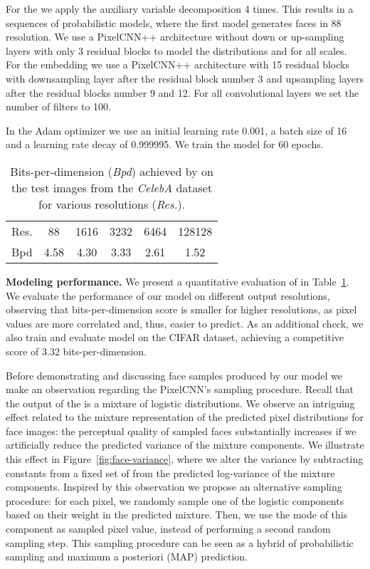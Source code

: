 For the \PYRAMID we apply the auxiliary variable decomposition 4 times.
This results in a sequences of probabilistic models, where the first model generates 
faces in 88 resolution. We use a PixelCNN++ architecture without down or up-sampling layers with 
only 3 residual blocks to model the distributions  and 
for all scales.
For the embedding  we use a PixelCNN++ architecture with
15 residual blocks with downsampling layer after the residual block 
number 3 and upsampling layers after the residual blocks number 9 and 12.
For all convolutional layers we set the number of filters to 100.

In the Adam optimizer we use an initial learning rate 0.001, a batch 
size of 16 and a learning rate decay of 0.999995.
We train the model for 60 epochs.

\begin{table}[t]
	\center
        \begin{tabular}{|l||c|c|c|c|c|}
        \hline
		Res. & 88 & 1616 & 3232  & 6464 & 128128 \\
		Bpd  & 4.58 & 4.30 & 3.33 & 2.61 & 1.52 \\
	\hline
	\end{tabular}
	\caption{Bits-per-dimension (\emph{Bpd}) achieved by \PYRAMID on the test images
	         from the \emph{CelebA} dataset for various resolutions (\emph{Res.}).}
	\label{table:CelebA}
\end{table}

\textbf{Modeling performance.}
We present a quantitative evaluation of \PYRAMID in Table~\ref{table:CelebA}.
We evaluate the performance of our model on different output resolutions,
observing that bits-per-dimension score is smaller for higher resolutions,
as pixel values are more correlated and, thus, easier to predict.
As an additional check, we also train and evaluate \PYRAMID model on
the CIFAR dataset, achieving a competitive score of 3.32 bits-per-dimension.

Before demonstrating and discussing face samples produced by our model 
we make an observation regarding the PixelCNN's sampling procedure.
Recall that the output of the \PYRAMID is a mixture of logistic 
distributions.
We observe an intriguing effect related to the mixture representation 
of the predicted pixel distributions for face images:
the perceptual quality of sampled faces substantially increases if 
we artificially reduce the predicted variance of the mixture components.
We illustrate this effect in Figure~\ref{fig:face-variance}, where 
we alter the variance by subtracting constants from a fixed set 
of  from the predicted log-variance of 
the mixture components.
Inspired by this observation we propose an alternative sampling procedure: 
for each pixel, we randomly sample one of the logistic components based 
on their weight in the predicted mixture. Then, we use the mode of this 
component as sampled pixel value, instead of performing a second random 
sampling step.
This sampling procedure can be seen as a hybrid of 
probabilistic sampling and maximum a posteriori (MAP) prediction. 

